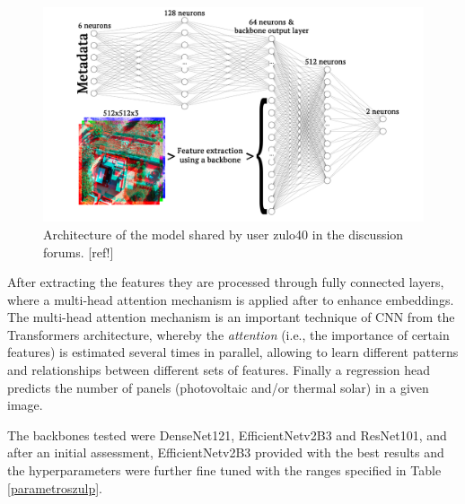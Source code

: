 \documentclass[conference]{IEEEtran}
\begin{document}

\begin{figure}[H]
    \centering
    \includegraphics[width=1\linewidth]{assets/nn.png}
    \caption{Architecture of the model shared by user zulo40 in the discussion forums. [ref!]}
    \label{fig:nn}
\end{figure}

After extracting the features they are processed through fully connected layers, where a multi-head attention mechanism is applied after to enhance embeddings. The multi-head attention mechanism is an important technique of CNN from the Transformers architecture, whereby the \textit{attention} (i.e., the importance of certain features) is estimated several times in parallel, allowing to learn different patterns and relationships between different sets of features. Finally a regression head predicts the number of panels (photovoltaic and/or thermal solar) in a given image.

The backbones tested were DenseNet121, EfficientNetv2B3 and ResNet101, and after an initial assessment, EfficientNetv2B3 provided with the best results and the hyperparameters were further fine tuned with the ranges specified in Table \ref{parametroszulp}.
\end{document}
